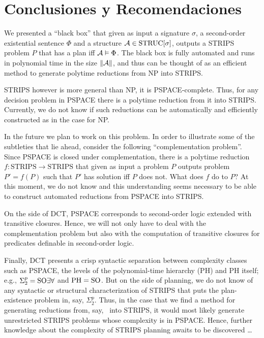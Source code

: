 \chapter{Conclusiones y Recomendaciones}
\label{Capitulo5}

We presented a ``black box'' that given as input a
signature $\sigma$, a second-order existential sentence
$\Phi$ and a structure $\mathcal{A}\in\text{STRUC}[\sigma]$, outputs
a STRIPS problem $P$ that has a plan iff $\mathcal{A}\vDash\Phi$.
The black box is fully automated and runs in polynomial
time in the size $\|\mathcal{A}\|$, and thus can be thought of
as an efficient method to generate polytime reductions
from NP into STRIPS.

STRIPS however is more general than NP, it is PSPACE-complete.
Thus, for any decision problem in PSPACE there is a polytime
reduction from it into STRIPS.
Currently, we do not know if such reductions can be %
automatically and efficiently constructed as in the case
for NP.  

In the future we plan to work on this problem.
In order to illustrate some of the subtleties that
lie ahead, consider the following ``complementation problem''.
Since PSPACE is closed under complementation, there is a
polytime reduction $f:\text{STRIPS}\rightarrow\text{STRIPS}$
that given as input a problem $P$ outputs problem $P'=f(P)$
such that $P'$ has solution iff $P$ does not.
What does $f$ do to $P$? At this moment, we do not know
and this understanding seems necessary to be able to
construct automated reductions from PSPACE into STRIPS.

On the side of DCT, PSPACE corresponds to second-order logic
extended with transitive closures. Hence, we will not only
have to deal with the complementation problem but also with
the computation of transitive closures for predicates definable
in second-order logic.

Finally, DCT presents a crisp syntactic separation between 
complexity classes such as PSPACE, the levels of the polynomial-time
hierarchy (PH) and PH itself; e.g., $\Sigma^p_2=\text{SO}\exists\forall$ and $\text{PH}=\text{SO}$.
But on the side of planning, we do not know of any syntactic
or structural characterization of STRIPS that puts the
plan-existence problem in, say, $\Sigma^p_2$.
Thus, in the case that we find a method for generating reductions
from, say, \SOEA\ into STRIPS, it would most likely generate
unrestricted STRIPS problems whose complexity is in PSPACE.
Hence, further knowledge about the complexity of STRIPS 
planning awaits to be discovered \ldots

